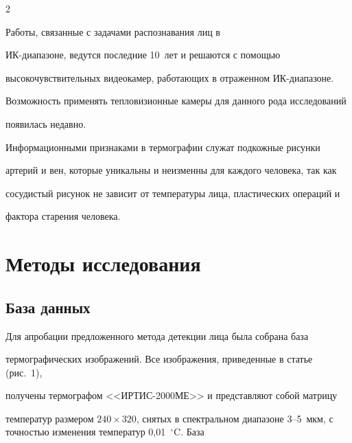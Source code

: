 \begin{multicols}{2}
  


  Работы, связанные с задачами распознавания лиц в  


  ИК-диа\-па\-зо\-не, ведутся последние 10~лет и решаются с помощью 


высокочувствительных видеокамер, работающих в отра\-жен\-ном ИК-диа\-па\-зо\-не. 


Возможность применять тепловизионные камеры для данного рода исследований 


появилась недавно. 


  


  Информационными признаками в термографии служат подкожные рисунки 


артерий и вен, которые уникальны и неизменны для каждого человека, так как 


сосудистый рисунок не зависит от температуры лица, пластических операций и 


фактора старения человека.





\vspace*{-6pt}





\section{Методы исследования}





\vspace*{-2pt}





\subsection{База данных}





  Для апробации предложенного метода детекции лица была собрана база 


термографических изображений. Все изображения, приведенные в статье (рис.~1), 


получены термографом <<ИРТИС-2000МЕ>> и представляют собой матрицу 


температур размером $240\times 320$, снятых в спектральном диапазоне 3--5~мкм, с точностью изменения температур 0,01~$^\circ$C. База 



\end{multicols}
